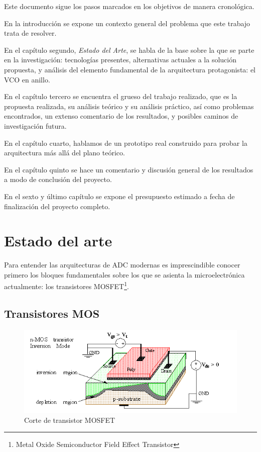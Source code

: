 \documentclass[12pt]{report} %
\begin{document}
	Este documento sigue los pasos marcados en los objetivos de manera cronológica.
	
	En la introducción se expone un contexto general del problema que este trabajo trata de resolver.
	
	En el capítulo segundo, \textit{Estado del Arte}, se habla de la base sobre la que se parte en la investigación: tecnologías presentes, alternativas actuales a la solución propuesta, y análisis del elemento fundamental de la arquitectura protagonista: el VCO en anillo.
	
	En el capítulo tercero se encuentra el grueso del trabajo realizado, que es la propuesta realizada, su análisis teórico y su análisis práctico, así como problemas encontrados, un extenso comentario de los resultados, y posibles caminos de investigación futura.
	
	En el capítulo cuarto, hablamos de un prototipo real construido para probar la arquitectura más allá del plano teórico.
	
	En el capítulo quinto se hace un comentario y discusión general de los resultados a modo de conclusión del proyecto.
	
	En el sexto y último capítulo se expone el presupuesto estimado a fecha de finalización del proyecto completo.
		

\chapter{Estado del arte}

	Para entender las arquitecturas de ADC modernas es imprescindible conocer primero los bloques fundamentales sobre los que se asienta la microelectrónica actualmente: los transistores MOSFET\footnote{Metal Oxide Semiconductor Field Effect Transistor}.
	
	\section{Transistores MOS}
	
	\begin{figure}[H]
		\includegraphics[width=\textwidth]{mos_transistor.png}
		\caption[Corte de transistor MOSFET]{Corte de transistor MOSFET\protect\footnotemark}
		\label{fig:mos_transistor.png}
	\end{figure}
\end{document}
